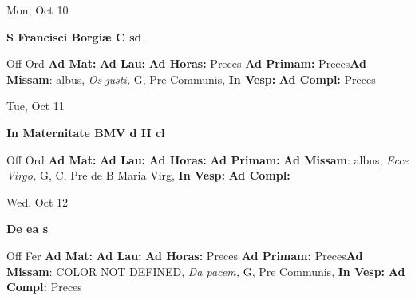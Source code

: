 \documentclass[10pt]{memoir}
\begin{document}
\begin{center}
\begin{minipage}{3.5in}
\vspace{2em}
\begin{center}Mon, Oct 10
\end{center}
\textbf{ \large S Francisci Borgiæ C
\textnormal{\normalsize sd}}

\begin{justify}Off Ord
\textbf{Ad Mat: }
\textbf{Ad Lau: }
\textbf{Ad Horas: }Preces
\textbf{Ad Primam: }Preces\textbf{Ad Missam}: albus, \textit{Os justi,} G, Pre Communis, 
\textbf{In Vesp: }
\textbf{Ad Compl: }Preces
\end{justify}
\end{minipage}
\end{center}

\begin{center}
\begin{minipage}{3.5in}
\vspace{2em}
\begin{center}Tue, Oct 11
\end{center}
\textbf{ \large In Maternitate BMV
\textnormal{\normalsize d II cl}}

\begin{justify}Off Ord
\textbf{Ad Mat: }
\textbf{Ad Lau: }
\textbf{Ad Horas: }
\textbf{Ad Primam: }\textbf{Ad Missam}: albus, \textit{Ecce Virgo,} G, C, Pre de B Maria Virg, 
\textbf{In Vesp: }
\textbf{Ad Compl: }
\end{justify}
\end{minipage}
\end{center}

\begin{center}
\begin{minipage}{3.5in}
\vspace{2em}
\begin{center}Wed, Oct 12
\end{center}
\textbf{ \large De ea
\textnormal{\normalsize s}}

\begin{justify}Off Fer
\textbf{Ad Mat: }
\textbf{Ad Lau: }
\textbf{Ad Horas: }Preces
\textbf{Ad Primam: }Preces\textbf{Ad Missam}: COLOR NOT DEFINED, \textit{Da pacem,} G, Pre Communis, 
\textbf{In Vesp: }
\textbf{Ad Compl: }Preces
\end{justify}
\end{minipage}
\end{center}
\end{document}
